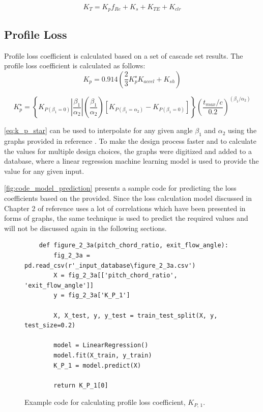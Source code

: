 \documentclass[12pt, letter]{report}
\begin{document}
\begin{equation}
    \label{eq:total_loss_cofficient}
    K_T = K_p f_{Re} + K_s + K_{TE} + K_{clr}
\end{equation}

\subsection{Profile Loss}
Profile loss coefficient is calculated based on a set of cascade set results. The profile loss coefficient is calculated as follows:
\begin{equation}
    \label{eq:profile_loss_eq}
    K_p = 0.914 \left(       \frac{2}{3} K_p^\star  K_{accel} + K_{sh}  \right)
\end{equation}

\begin{equation}
        \label{eq:k_p_star}
        K_p^\star = \left\{   K_{P(\beta_1 = 0)}    \left| \frac{\beta_1}{\alpha_2} \right| \left(\frac{\beta_1}{\alpha_2} \right)   \left[K_{P(\beta_1 = \alpha_2)} - K_{P(\beta_1 = 0)} \right]            \right\}  \left(   \frac{t_{max}/c}{0.2}\right)^{(\beta_1 / \alpha_2)}
\end{equation}

\vspace{10pt}
\autoref{eq:k_p_star} can be used to interpolate for any given angle $\beta_1$ and $\alpha_2$ using the graphs provided in reference \cite{moustapha2003}. To make the design process faster and to calculate the values for multiple design choices, the graphs were digitized and added to a database, where a linear regression machine learning model is used to provide the value for any given input. \par \autoref{fig:code_model_prediction} presents a sample code for predicting the loss coefficients based on the provided. Since the loss calculation model discussed in Chapter 2 of reference \cite{moustapha2003} uses a lot of correlations which have been presented in forms of graphs, the same technique is used to predict the required values and will not be discussed again in the following sections.

\begin{figure}[H]
    \begin{verbatim}
    def figure_2_3a(pitch_chord_ratio, exit_flow_angle):
        fig_2_3a = pd.read_csv(r'_input_database\figure_2_3a.csv')
        X = fig_2_3a[['pitch_chord_ratio', 'exit_flow_angle']]
        y = fig_2_3a['K_P_1']
    
        X, X_test, y, y_test = train_test_split(X, y, test_size=0.2)
    
        model = LinearRegression()
        model.fit(X_train, y_train)
        K_P_1 = model.predict(X)
        
        return K_P_1[0]
    \end{verbatim}
    \caption{Example code for calculating profile loss coefficient, $K_{P, \, 1}$.}
    \label{fig:code_model_prediction}
\end{figure}
\end{document}

